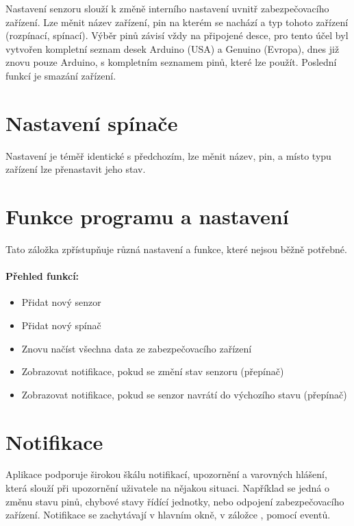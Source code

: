 \documentclass[FM,MP]{tulthesis}  %
\begin{document}
Nastavení senzoru slouží k změně interního nastavení uvnitř zabezpečovacího zařízení. Lze měnit název zařízení, pin na kterém se nachází a typ tohoto zařízení (rozpínací, spínací). Výběr pinů závisí vždy na připojené desce, pro tento účel byl vytvořen kompletní seznam desek Arduino (USA) a Genuino (Evropa), dnes již znovu pouze Arduino, s kompletním seznamem pinů, které lze použít. Poslední funkcí je smazání zařízení.

\section{Nastavení spínače}
Nastavení je téměř identické s předchozím, lze měnit název, pin, a místo typu zařízení lze přenastavit jeho stav.

\section{Funkce programu a nastavení}
Tato záložka zpřístupňuje různá nastavení a funkce, které nejsou běžně potřebné.

\paragraph{Přehled funkcí:}
\begin{itemize}
\item Přidat nový senzor
\item Přidat nový spínač
\item Znovu načíst všechna data ze zabezpečovacího zařízení
\item Zobrazovat notifikace, pokud se změní stav senzoru (přepínač)
\item Zobrazovat notifikace, pokud se senzor navrátí do výchozího stavu (přepínač)
\end{itemize} 

\section{Notifikace}
Aplikace podporuje širokou škálu notifikací, upozornění a varovných hlášení, která slouží při upozornění uživatele na nějakou situaci. Například se jedná o změnu stavu pinů, chybové stavy řídící jednotky, nebo odpojení zabezpečovacího zařízení. Notifikace se zachytávají v hlavním okně, v záložce , pomocí eventů.
\end{document}
